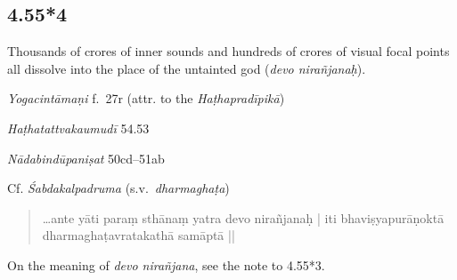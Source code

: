 \begin{ekdosis}
\subsection*{4.55*4}
\begin{translation}[hp04_055_4]
Thousands of crores of inner sounds and hundreds of crores of visual focal points all dissolve into the place of the untainted god (\emph{devo nirañjanaḥ}).
%
\end{translation}

\begin{testimonia}[hp04_055_4]
\emph{Yogacintāmaṇi} f.~27r (attr. to the \emph{Haṭhapradīpikā})
\begin{versinnote}
\end{versinnote}

\emph{Haṭhatattvakaumudī} 54.53
\begin{versinnote}
\end{versinnote}

\emph{Nādabindūpaniṣat} 50cd--51ab
\begin{versinnote}
\end{versinnote}

Cf. \emph{Śabdakalpadruma} (s.v.~\emph{dharmaghaṭa})
\begin{quote}
\dots ante yāti paraṃ sthānaṃ yatra devo nirañjanaḥ |
iti bhaviṣyapurāṇoktā dharmaghaṭavratakathā samāptā ||
\end{quote}
\end{testimonia}

\begin{philcomm}[hp04_055_4]
On the meaning of \emph{devo nirañjana}, see the note to 4.55*3.

\end{philcomm}


\end{ekdosis}
